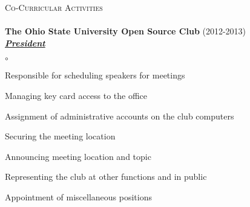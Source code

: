 \documentclass{article}
\newcommand{\lineunder}{\vspace*{-8pt} \\ \hspace*{-18pt} \hrulefill \\}
\newcommand{\header}[1]{{\hspace*{-15pt}\vspace*{6pt} \textsc{#1}} \vspace*{-6pt} \lineunder}
\newcommand{\organization}[3]{{ \textbf{#1} (#2)\\ \underline{\textbf{\emph{#3}}}\\  }}
\newenvironment{achievements}{\begin{list}{$\circ$}{\topsep 0pt \itemsep -2pt}}{\vspace*{4pt}\end{list}}
\begin{document}
\header{Co-Curricular Activities}
\organization{The Ohio State University Open Source Club}{2012-2013}{President}
	\begin{achievements}
	\item Responsible for scheduling speakers for meetings
	\item Managing key card access to the office
	\item Assignment of administrative accounts on the club computers
	\item Securing the meeting location
	\item Announcing meeting location and topic
	\item Representing the club at other functions and in public
	\item Appointment of miscellaneous positions
	\end{achievements}

%
%
\end{document}
